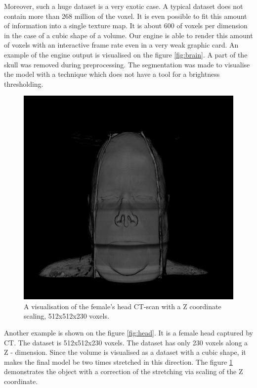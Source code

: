 \documentclass[twoside, english, 11pt]{report}
\begin{document}
Moreover, such a huge dataset is a very exotic case. A typical dataset does not contain more than 268 million of the voxel. It is even possible to fit this amount of information into a single texture map. It is about 600 of voxels per dimension in the case of a cubic shape of a volume. Our engine is able to render this amount of voxels with an interactive frame rate even in a very weak graphic card. An example of the engine output is visualised on the figure \ref{fig:brain}. A part of the skull was removed during preprocessing. The segmentation was made to visualise the model with a technique which does not have a tool for a brightness thresholding.\\


\begin{figure}[H]
\centerline{\includegraphics[scale = 0.55]{img/head-zcor}}
\caption{A visualisation of the female's head CT-scan with a Z coordinate scaling, 512x512x230 voxels.\label{fig:head-zcor}}
\end{figure}
Another example is shown on the figure \ref{fig:head}. It is a female head captured by CT. The dataset is 512x512x230 voxels. The dataset has only 230 voxels along a Z - dimension. Since the volume is visualised as a dataset with a cubic shape, it makes the final model be two times stretched in this direction. The figure \ref{fig:head-zcor} demonstrates the object with a correction of the stretching via scaling of the Z coordinate.\\
\end{document}
